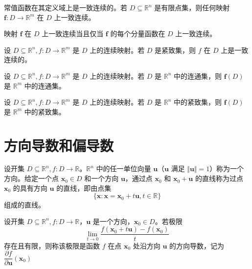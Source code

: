 \begin{remark}
  常值函数在其定义域上是一致连续的。若 $D \subseteq \mathbb{R}^n$ 是有限点集，则任何映射 $\bm{f}: D \to \mathbb{R}^m$ 在 $D$ 上一致连续。
\end{remark}

\begin{remark}
  映射 $\bm{f}$ 在 $D$ 上一致连续当且仅当 $\bm{f}$ 的每个分量函数在 $D$ 上一致连续。
\end{remark}

\begin{theorem}
    设 $D \subseteq \mathbb{R}^n, f: D \to \mathbb{R}^m$ 是 $D$ 上的连续映射。若 $D$ 是紧致集，则 $f$ 在 $D$ 上是一致连续的。
\end{theorem}

\begin{theorem}
    设 $D \subseteq \mathbb{R}^n, f: D \to \mathbb{R}^m$ 是 $D$ 上的连续映射。若 $D$ 是 $\mathbb{R}^n$ 中的连通集，则 $\bm{f}(D)$ 是 $\mathbb{R}^m$ 中的连通集。
\end{theorem}

\begin{theorem}
    设 $D \subseteq \mathbb{R}^n, f: D \to \mathbb{R}^m$ 是 $D$ 上的连续映射。若 $D$ 是 $\mathbb{R}^n$ 中的紧致集，则 $\bm{f}(D)$ 是 $\mathbb{R}^m$ 中的紧致集。
\end{theorem}


\section{方向导数和偏导数}

\begin{definition}
  设开集 $D \subseteq \mathbb{R}^n, f: D \to \mathbb{R}$。$\mathbb{R}^n$ 中的任一单位向量 $\bm{u}$（$\bm{u}$ 满足 $\Vert \bm{u} \Vert = 1$）称为一个方向。给定一个点 $\bm{x}_0 \in D$ 和一个方向 $\bm{u}$，通过点 $\bm{x}_0$ 和 $\bm{x}_0 + \bm{u}$ 的直线称为过点 $\bm{x}_0$ 的具有方向 $\bm{u}$ 的直线，即由点集
  \[
      \{\bm{x}: \bm{x} = \bm{x}_0 + t \bm{u}, t \in \mathbb{R}\}
  \]
  组成的直线。
\end{definition}

\begin{definition}
  设开集 $D \subseteq \mathbb{R}^n, f: D \to \mathbb{R}$，$\bm{u}$ 是一个方向，$\bm{x}_0 \in D$。若极限
  \[
      \lim_{t \to 0}\frac{f(\bm{x}_0 + t \bm{u}) - f(\bm{x}_0)}{t}
  \]
  存在且有限，则称该极限是函数 $f$ 在点 $\bm{x}_0$ 处沿方向 $\bm{u}$ 的方向导数，记为 $\dfrac{\partial f}{\partial \bm{u}}(\bm{x}_0)$
\end{definition}

